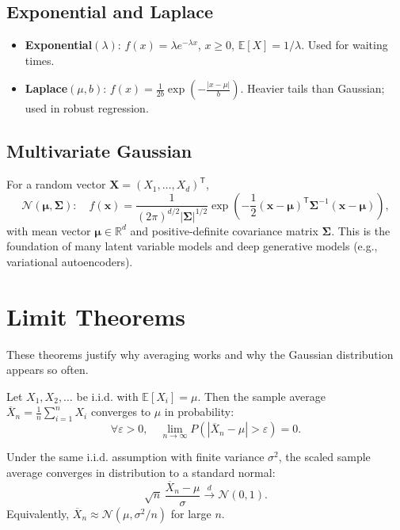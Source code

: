 \documentclass{tufte-handout}
\begin{document}
\subsection{Exponential and Laplace}
\begin{itemize}
    \item \textbf{Exponential}$(\lambda)$: $f(x) = \lambda e^{-\lambda x}$, $x \ge 0$, $\mathbb{E}[X]=1/\lambda$. Used for waiting times.
    \item \textbf{Laplace}$(\mu,b)$: $f(x) = \frac{1}{2b}\exp\!\left(-\frac{|x-\mu|}{b}\right)$. Heavier tails than Gaussian; used in robust regression.
\end{itemize}

\subsection{Multivariate Gaussian}
For a random vector $\mathbf{X} = (X_1,\dots,X_d)^{\mathsf{T}}$,
\[
\mathcal{N}(\boldsymbol{\mu}, \boldsymbol{\Sigma}):\quad f(\mathbf{x}) = \frac{1}{(2\pi)^{d/2}|\boldsymbol{\Sigma}|^{1/2}} \exp\!\left(-\frac{1}{2}(\mathbf{x}-\boldsymbol{\mu})^{\mathsf{T}}\boldsymbol{\Sigma}^{-1}(\mathbf{x}-\boldsymbol{\mu})\right),
\]
with mean vector $\boldsymbol{\mu} \in \mathbb{R}^d$ and positive‑definite covariance matrix $\boldsymbol{\Sigma}$. This is the foundation of many latent variable models and deep generative models (e.g., variational autoencoders).

\section{Limit Theorems}

These theorems justify why averaging works and why the Gaussian distribution appears so often.

\begin{thm}
    Let $X_1, X_2, \dots$ be i.i.d. with $\mathbb{E}[X_i] = \mu$. Then the sample average $\overline{X}_n = \frac{1}{n}\sum_{i=1}^n X_i$ converges to $\mu$ in probability:
    \[
    \forall \varepsilon >0,\quad \lim_{n\to\infty} P(|\overline{X}_n - \mu| > \varepsilon) = 0.
    \]
\end{thm}

\begin{thm}
    Under the same i.i.d. assumption with finite variance $\sigma^2$, the scaled sample average converges in distribution to a standard normal:
    \[
    \sqrt{n}\,\frac{\overline{X}_n - \mu}{\sigma} \xrightarrow{d} \mathcal{N}(0,1).
    \]
    Equivalently, $\overline{X}_n \approx \mathcal{N}(\mu, \sigma^2/n)$ for large $n$.
\end{thm}
\end{document}
